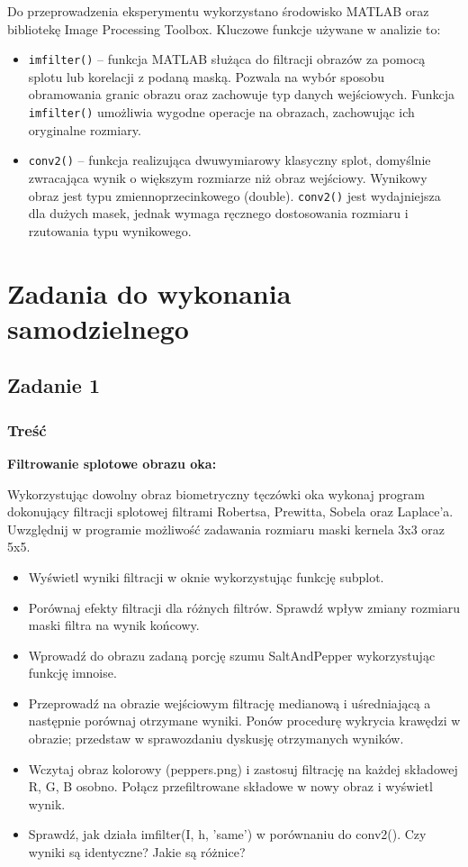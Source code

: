 Do przeprowadzenia eksperymentu wykorzystano środowisko MATLAB oraz bibliotekę Image Processing Toolbox. Kluczowe funkcje używane w analizie to:

\begin{itemize}
	\item \texttt{imfilter()} – funkcja MATLAB służąca do filtracji obrazów za pomocą splotu lub korelacji z podaną maską. Pozwala na wybór sposobu obramowania granic obrazu oraz zachowuje typ danych wejściowych. Funkcja \texttt{imfilter()} umożliwia wygodne operacje na obrazach, zachowując ich oryginalne rozmiary.
	
	\item \texttt{conv2()} – funkcja realizująca dwuwymiarowy klasyczny splot, domyślnie zwracająca wynik o większym rozmiarze niż obraz wejściowy. Wynikowy obraz jest typu zmiennoprzecinkowego (double). \texttt{conv2()} jest wydajniejsza dla dużych masek, jednak wymaga ręcznego dostosowania rozmiaru i rzutowania typu wynikowego.
\end{itemize}
\clearpage

\section{Zadania do wykonania samodzielnego}

\subsection{Zadanie 1}

\subsubsection{Treść}
\textbf{Filtrowanie splotowe obrazu oka:}

Wykorzystując dowolny obraz biometryczny tęczówki oka wykonaj program dokonujący
filtracji splotowej filtrami Robertsa, Prewitta, Sobela oraz Laplace’a. Uwzględnij w programie
możliwość zadawania rozmiaru maski kernela 3x3 oraz 5x5.

\begin{itemize}
	\item Wyświetl wyniki filtracji w oknie wykorzystując funkcję subplot.
	\item Porównaj efekty filtracji dla różnych filtrów. Sprawdź wpływ zmiany rozmiaru maski filtra na
	wynik końcowy.
	\item Wprowadź do obrazu zadaną porcję szumu SaltAndPepper wykorzystując funkcję imnoise.
	\item Przeprowadź na obrazie wejściowym filtrację medianową i uśredniającą a następnie porównaj otrzymane wyniki. Ponów procedurę wykrycia krawędzi w obrazie; przedstaw w sprawozdaniu dyskusję otrzymanych wyników.
	\item Wczytaj obraz kolorowy (peppers.png) i zastosuj filtrację na każdej składowej R, G, B osobno.
	Połącz przefiltrowane składowe w nowy obraz i wyświetl wynik.
	\item Sprawdź, jak działa imfilter(I, h, 'same') w porównaniu do conv2(). Czy wyniki są identyczne?
	Jakie są różnice?
\end{itemize}

